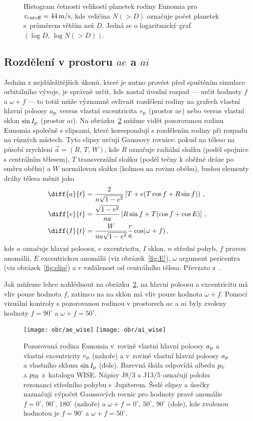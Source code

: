 \documentclass[A4paper, 12pt, oneside]{book}
\begin{document}
\begin{figure}
\begin{subfigure}[b]{0.45\textwidth}
	\end{subfigure}
	\caption{Histogram četnosti velikostí planetek rodiny Eunomia pro $v_{\rm cutoff}=44\,{\rm m/s}$, kde veličina $N({>}D)$ označuje počet planetek s~průměrem větším než $D$. Jedná se o logaritmický graf $(\log D,\,\log N({>}D))$.}
	\label{size_distribution}
\end{figure}
\subsection{Rozdělení v prostoru $ae$ a $ai$}
Jedním z nejdůležitějších úkonů, které je nutno provést před spuštěním simulace orbitálního vývoje, je správně určit, kde nastal úvodní rozpad --- určit hodnoty $f$ a $\omega+f$ --- to totiž může významně ovlivnit rozdělení rodiny na grafech vlastní hlavní poloosy $a_{\rm p}$ versus vlastní excentricita $e_{\rm p}$ (prostor $ae$) nebo versus vlastní sklon $\sin I_{\rm p}$ (prostor $ai$). Na obrázku~\ref{fig:ae_ai_wise} můžme vidět pozorovanou rodinu Eunomia společně s elipsami, které korespondují s rozdělením rodiny při rozpadu na různých místech. Tyto elipsy určují Gaussovy rovnice: pokud na těleso na působí zrychlení $\vec{a}=(R,\,T,\,W)$, kde $R$ označuje radiální složku (podél spojnice s centrálním tělesem), $T$ transverzální složku (podél tečny k oběžné dráze po směru oběhu) a $W$ normálovou složku (kolmou na rovinu oběhu), budou elementy dráhy tělesa měnit jako
\begin{align*}
	\diff{a}{t}&=\frac{2}{n\sqrt{1-e^2}}\left[T+e(T\cos f+R\sin f)\right) \,, \\
	\diff{e}{t}&=\frac{\sqrt{1-e^2}}{na}\left[R\sin f+T(\cos f+\cos E)\right]\,, \\
	\diff{I}{t}&=\frac{W}{na\sqrt{1-e^2}}\frac{r}{a}\cos(\omega+f)\,,
\end{align*}
kde $a$ označuje hlavní poloosu, $e$ excentricitu, $I$ sklon, $n$ střední pohyb, $f$ pravou anomálii, $E$ excentrickou anomálii (viz obrázek~\ref{fig:E}), $\omega$ argument pericentra (viz obrázek~\ref{fig:elip}) a $r$ vzdálenost od centrálního tělesa. Převzato z~\cite{fmt}.

Jak můžeme lehce nahlédnout na obrázku~\ref{fig:ae_ai_wise}, na hlavní poloosu a excentricitu má vliv pouze hodnota $f$, zatímco na na sklon má vliv pouze hodnota $\omega+f$. Pomocí vizuální kontroly s pozorovanou rodinou v prostorech $ae$ a $ai$ byly zvoleny hodnoty $f=90^\circ$ a $\omega+f=50^\circ$.
\begin{figure}
	\centering
	\texttt{[image: obr/ae\_wise]}
	\texttt{[image: obr/ai\_wise]}
	\caption{Pozorovaná rodina Eunomia v~rovině vlastní hlavní poloosy $a_{\rm p}$ a vlastní excentricity $e_{\rm p}$ (nahoře) a v~rovině vlastní hlavní poloosy $a_{\rm p}$ a vlastního sklonu $\sin I_{\rm p}$ (dole). Barevná škála odpovídá albedu $p_{\rm V}$ a $p_{\rm IR}$ z~katalogu WISE\@. Nápisy J8/3 a J13/5 označují polohu rezonancí středního pohybu s~Jupiterem. Šedé elipsy a úsečky naznačují výpočet Gaussových rovnic pro hodnoty pravé anomálie $f=0^\circ,\,90^\circ,\,180^\circ$ (nahoře) a $\omega+f=0^\circ,\, 50^\circ,\, 90^\circ$ (dole), kde zvolenou hodnotou je $f=90^\circ$ a $\omega+f=50^\circ$.}
	\label{fig:ae_ai_wise}
\end{figure}
\end{document}
